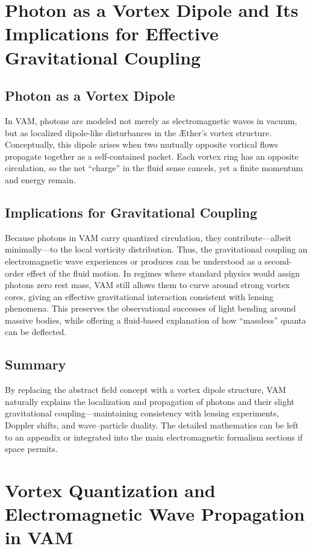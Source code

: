 \section{Photon as a Vortex Dipole and Its Implications for Effective Gravitational Coupling}

\subsection{Photon as a Vortex Dipole}
In VAM, photons are modeled not merely as electromagnetic waves in vacuum, but as localized dipole-like disturbances in the Æther's vortex structure. Conceptually, this dipole arises when two mutually opposite vortical flows propagate together as a self-contained packet. Each vortex ring has an opposite circulation, so the net “charge” in the fluid sense cancels, yet a finite momentum and energy remain.

\subsection{Implications for Gravitational Coupling}
Because photons in VAM carry quantized circulation, they contribute—albeit minimally—to the local vorticity distribution. Thus, the gravitational coupling an electromagnetic wave experiences or produces can be understood as a second-order effect of the fluid motion. In regimes where standard physics would assign photons zero rest mass, VAM still allows them to curve around strong vortex cores, giving an effective gravitational interaction consistent with lensing phenomena. This preserves the observational successes of light bending around massive bodies, while offering a fluid-based explanation of how “massless” quanta can be deflected.

\subsection{Summary}
By replacing the abstract field concept with a vortex dipole structure, VAM naturally explains the localization and propagation of photons and their slight gravitational coupling—maintaining consistency with lensing experiments, Doppler shifts, and wave–particle duality. The detailed mathematics can be left to an appendix or integrated into the main electromagnetic formalism sections if space permits.

\section{Vortex Quantization and Electromagnetic Wave Propagation in VAM}


